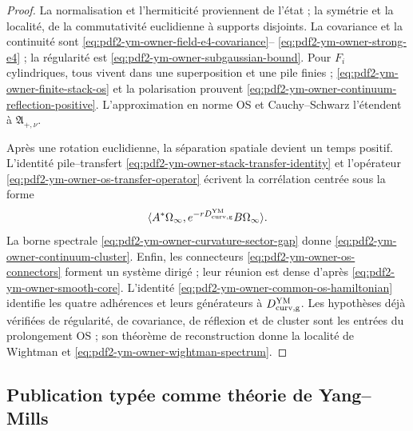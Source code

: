 \begin{proof}
La normalisation et l’hermiticité proviennent de l’état ; la symétrie et la localité, de la
commutativité euclidienne à supports disjoints. La covariance et la continuité sont
\eqref{eq:pdf2-ym-owner-field-e4-covariance}--
\eqref{eq:pdf2-ym-owner-strong-e4} ; la régularité est
\eqref{eq:pdf2-ym-owner-subgaussian-bound}. Pour
$F_i$ cylindriques, tous vivent dans une superposition et une pile finies ;
\eqref{eq:pdf2-ym-owner-finite-stack-os} et la polarisation prouvent
\eqref{eq:pdf2-ym-owner-continuum-reflection-positive}. L’approximation en norme OS
et Cauchy--Schwarz l’étendent à $\mathfrak A_{+,\nu}$.

Après une rotation euclidienne, la séparation spatiale devient un temps positif.
L’identité pile--transfert
\eqref{eq:pdf2-ym-owner-stack-transfer-identity} et l’opérateur
\eqref{eq:pdf2-ym-owner-os-transfer-operator} écrivent la corrélation centrée sous la forme
\[
 \langle A^*\Omega_\infty,
 e^{-rD_{\rm curv,g}^{\rm YM}}B\Omega_\infty\rangle.
\]
La borne spectrale \eqref{eq:pdf2-ym-owner-curvature-sector-gap} donne \eqref{eq:pdf2-ym-owner-continuum-cluster}. Enfin, les connecteurs \eqref{eq:pdf2-ym-owner-os-connectors} forment un système dirigé ; leur réunion est dense d'après \eqref{eq:pdf2-ym-owner-smooth-core}. L'identité \eqref{eq:pdf2-ym-owner-common-os-hamiltonian} identifie les quatre adhérences et leurs générateurs à $D_{\rm curv,g}^{\rm YM}$. Les hypothèses déjà vérifiées de régularité, de covariance, de réflexion et de cluster sont les entrées du prolongement OS ; son théorème de reconstruction donne la localité de Wightman et \eqref{eq:pdf2-ym-owner-wightman-spectrum}.
\end{proof}

\subsection{Publication typée comme théorie de Yang--Mills}

